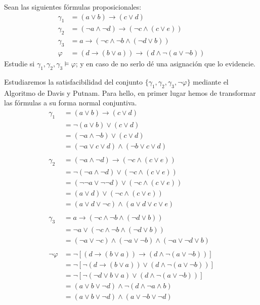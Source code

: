 \begin{ejercicio}\label{ej:1.3.4}
    Sean las siguientes fórmulas proposicionales:
    \begin{align*}
        \gamma_1 &= (a\lor b)\rightarrow (c\lor d)\\
        \gamma_2 &= (\lnot a\land \lnot d)\rightarrow (\lnot c\land (c\lor e))\\
        \gamma_3 &= a \rightarrow (\lnot c\land \lnot b \land (\lnot d\lor b))\\
        \varphi &= (d\rightarrow(b\lor a)) \rightarrow (d\land \lnot (a\lor \lnot b))        
    \end{align*}
    Estudie si $\gamma_1,\gamma_2,\gamma_3\vDash \varphi$; y en caso de no serlo dé una asignación que lo evidencie.

    Estudiaremos la satisfacibilidad del conjunto $\{\gamma_1,\gamma_2,\gamma_3,\lnot \varphi\}$
    mediante el Algoritmo de Davis y Putnam. Para hello, en primer
    lugar hemos de transformar las fórmulas a su forma normal conjuntiva.
    \begin{align*}
        \gamma_1 &= (a\lor b)\rightarrow (c\lor d)\\
        &= \lnot (a\lor b)\lor (c\lor d)\\
        &= (\lnot a\land \lnot b)\lor (c\lor d)\\
        &= (\lnot a\lor c\lor d)\land (\lnot b\lor c\lor d)\\ \\
        \gamma_2 &= (\lnot a\land \lnot d)\rightarrow (\lnot c\land (c\lor e))\\
        &= \lnot (\lnot a\land \lnot d)\lor (\lnot c\land (c\lor e))\\
        &= (\lnot \lnot a \lor \lnot \lnot d)\lor (\lnot c\land (c\lor e))\\
        &= (a\lor d)\lor (\lnot c\land (c\lor e))\\
        &= (a\lor d \lor \lnot c)\land (a\lor d\lor c\lor e)\\ \\
        \gamma_3 &= a \rightarrow (\lnot c\land \lnot b \land (\lnot d\lor b))\\
        &= \lnot a\lor (\lnot c\land \lnot b \land (\lnot d\lor b))\\
        &= (\lnot a\lor \lnot c) \land (\lnot a\lor \lnot b) \land (\lnot a\lor \lnot d\lor b)\\ \\
        \lnot \varphi &= \lnot \left[(d\rightarrow(b\lor a)) \rightarrow (d\land \lnot (a\lor \lnot b))\right]\\
        &= \lnot \left[\lnot (d\rightarrow(b\lor a))\lor (d\land \lnot (a\lor \lnot b))\right]\\
        &= \lnot \left[\lnot (\lnot d\lor b\lor a)\lor (d\land \lnot (a\lor \lnot b))\right]\\
        &= (a\lor b\lor \lnot d)\land \lnot(d\land \lnot a\land b)\\
        &= (a\lor b\lor \lnot d)\land (a \lor \lnot b\lor \lnot d)
    \end{align*}


\end{ejercicio}
